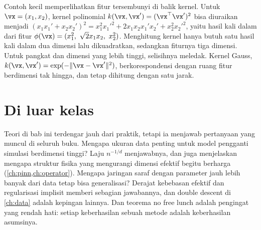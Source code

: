 Contoh kecil memperlihatkan fitur tersembunyi di balik kernel. Untuk $\vx=(x_1,x_2)$, kernel polinomial $k(\vx,\vx')=(\vx^\top\vx')^2$
bisa diuraikan menjadi $(x_1x_1'+x_2x_2')^2=x_1^2x_1'^2+2x_1x_2x_1'x_2'+x_2^2x_2'^2$, yaitu hasil kali dalam dari fitur
$\phi(\vx)=(x_1^2,\ \sqrt2x_1x_2,\ x_2^2)$. Menghitung kernel hanya butuh satu hasil kali dalam dua dimensi lalu dikuadratkan,
sedangkan fiturnya tiga dimensi. Untuk pangkat dan dimensi yang lebih tinggi, selisihnya meledak. Kernel Gauss,
$k(\vx,\vx')=\exp(-\|\vx-\vx'\|^2)$, berkorespondensi dengan ruang fitur berdimensi tak hingga, dan tetap dihitung dengan satu jarak.

\section{Di luar kelas}

Teori di bab ini terdengar jauh dari praktik, tetapi ia menjawab pertanyaan yang muncul di seluruh buku. Mengapa ukuran data penting
untuk model pengganti simulasi berdimensi tinggi? Laju $n^{-1/d}$ menjawabnya, dan juga menjelaskan mengapa struktur fisika yang
mengurangi dimensi efektif begitu berharga (\cref{ch:pinn,ch:operator}). Mengapa jaringan saraf dengan parameter jauh lebih banyak dari
data tetap bisa generalisasi? Derajat kebebasan efektif dan regularisasi implisit memberi sebagian jawabannya, dan double descent di
\cref{ch:data} adalah kepingan lainnya. Dan teorema no free lunch adalah pengingat yang rendah hati: setiap keberhasilan sebuah metode
adalah keberhasilan asumsinya.

